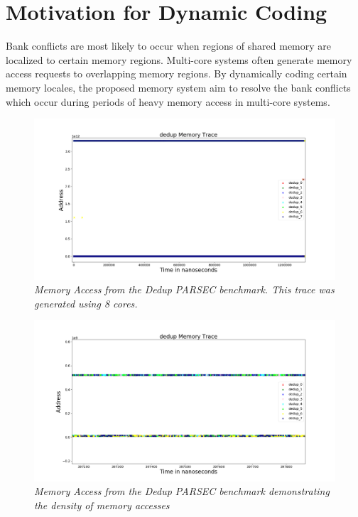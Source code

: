 \section{Motivation for Dynamic Coding}\label{sec:parsec_motivation}
Bank conflicts are most likely to occur when regions of shared memory are localized to certain memory regions. Multi-core systems often generate memory access requests to overlapping memory regions. By dynamically coding certain memory locales, the proposed memory system aim to resolve the bank conflicts which occur during periods of heavy memory access in multi-core systems.

\begin{figure}[htbp]
		\includegraphics[width=\linewidth]{fig/dedup_whole.png}
		\caption{\it{Memory Access from the Dedup PARSEC benchmark. This trace was generated using 8 cores.}}
		\label{fig:dedup_whole}
\end{figure}

\begin{figure}[htbp]
		\includegraphics[width=\linewidth]{fig/dedup_dense.png}
		\caption{\it{Memory Access from the Dedup PARSEC benchmark demonstrating the density of memory accesses}}
		\label{fig:dedup_dense}
\end{figure}

